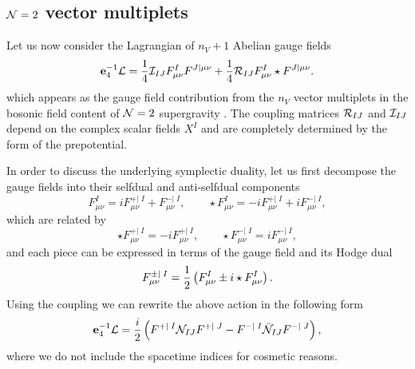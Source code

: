 \subsection[\titleN$= 2$ vector multiplets]{${\cal N} = 2$ vector multiplets}

Let us now consider the Lagrangian of $n_V + 1$ Abelian gauge fields
\begin{equation}
\label{eq:mulveclag}
	 \mathbf{e}_4^{-1} {\cal L} = \frac{1}{4} {\cal I}_{IJ} F^I_{\mu \nu} F^{J|\mu \nu} + \frac{1}{4} {\cal R}_{IJ} F^I_{\mu \nu} \star F^{J|\mu \nu}.
\end{equation}
which appears as the gauge field contribution from the $n_V$ vector multiplets in the bosonic field content of ${\cal N} = 2$ supergravity . The coupling matrices ${\cal R}_{IJ}$ and ${\cal I}_{IJ}$ depend on the complex scalar fields $X^I$ and are completely determined by the form of the prepotential. 

In order to discuss the underlying symplectic duality, let us first decompose the gauge fields into their selfdual and anti-selfdual components
\begin{equation*}
	F^I_{\mu \nu} = i F^{+ | \; I}_{\mu \nu} + F^{- | \; I}_{\mu \nu}, \qquad \star F^I_{\mu \nu} = -i F^{+ | \; I}_{\mu \nu} + i F^{- | \; I}_{\mu \nu},
\end{equation*}
which are related by
\begin{equation*}
	\star F^{+ | \; I}_{\mu \nu} = - i  F^{+ | \; I}_{\mu \nu}, \qquad \star F^{- | \; I}_{\mu \nu} = i F^{- | \; I}_{\mu \nu},
\end{equation*}
and each piece can be expressed in terms of the gauge field and its Hodge dual
\begin{equation*}
	F^{\pm | \; I}_{\mu \nu} = \frac{1}{2} \left( F^I_{\mu \nu} \pm i \star F^I_{\mu \nu} \right).
\end{equation*}
Using the coupling  we can rewrite the above action in the following form \cite{Mohaupt:2000mj}
\begin{equation*}
	\mathbf{e}_4^{-1} {\cal L} =  \frac{i}{2} \left( F^{+ | \; I} {\cal N}_{IJ} F^{+ | \; J} - F^{- | \; I} \bar{{\cal N}}_{IJ} F^{- | \; J}  \right),
\end{equation*}
where we do not include the spacetime indices for cosmetic reasons. 

